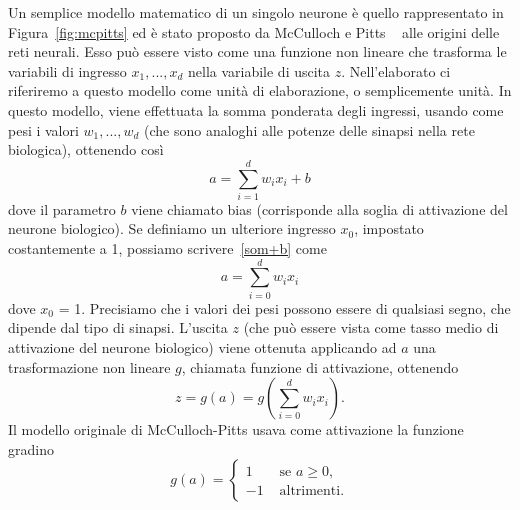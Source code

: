 \documentclass[11pt,a4paper,twoside,
openright]{book}
\begin{document}
Un semplice modello matematico di un singolo neurone è quello rappresentato in Figura~\ref{fig:mcpitts} ed è stato proposto da McCulloch e Pitts ~\cite{McCulloch:1943aa} alle origini delle reti neurali. Esso può essere visto come una funzione non lineare che trasforma le variabili di ingresso $x_{1}, ..., x_{d}$ nella variabile di uscita $z$. Nell’elaborato ci riferiremo a questo modello come unità di elaborazione, o semplicemente unità.
In questo modello, viene effettuata la somma ponderata degli ingressi, usando come pesi i valori $w_{1}, ..., w_{d}$ (che sono analoghi alle potenze delle sinapsi nella rete biologica), ottenendo così
\begin{equation}
a = \sum\limits_{i=1}^d w_{i}x_{i}+b
\label{som+b}
\end{equation}
dove il parametro $b$ viene chiamato bias (corrisponde alla soglia di attivazione del neurone biologico). Se definiamo un ulteriore ingresso $x_{0}$, impostato costantemente a 1, possiamo scrivere~\eqref{som+b} come
\begin{equation}
a = \sum\limits_{i=0}^d w_{i}x_{i}
\label{som}
\end{equation}
dove $x_{0}$ = 1. Precisiamo che i valori dei pesi possono essere di qualsiasi segno, che dipende dal tipo di sinapsi. L’uscita $z$ (che può essere vista come tasso medio di attivazione del neurone biologico) viene ottenuta applicando ad $a$ una trasformazione non lineare $g$, chiamata funzione di attivazione, ottenendo 
\begin{equation}
z=g(a)=g\left( \sum\limits_{i=0}^d w_{i}x_{i} \right).
\label{act+som}
\end{equation}
Il modello originale di McCulloch-Pitts usava come attivazione la funzione gradino
\begin{equation}
g(a)=
\begin{cases}
1 &\text{ se } a\geq0, \\
-1 &\text{ altrimenti}.
\end{cases}
\label{act+som}
\end{equation}
\end{document}
